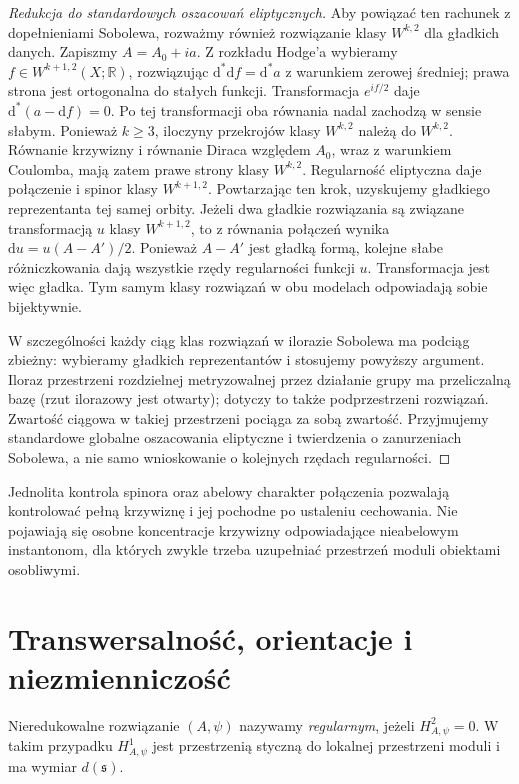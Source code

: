 \begin{proof}[Redukcja do standardowych oszacowań eliptycznych]
Aby powiązać ten rachunek z dopełnieniami Sobolewa,
rozważmy również rozwiązanie klasy $W^{k,2}$ dla
gładkich danych. Zapiszmy $A=A_0+ia$.
Z rozkładu Hodge'a wybieramy
$f\in W^{k+1,2}(X;\mathbb R)$, rozwiązując
$\mathrm d^*\mathrm df=\mathrm d^*a$ z warunkiem
zerowej średniej; prawa strona jest ortogonalna
do stałych funkcji. Transformacja $e^{if/2}$
daje $\mathrm d^*(a-\mathrm df)=0$.
Po tej transformacji oba równania nadal zachodzą
w sensie słabym. Ponieważ $k\geq3$, iloczyny
przekrojów klasy $W^{k,2}$ należą do $W^{k,2}$.
Równanie krzywizny i równanie Diraca względem
$A_0$, wraz z warunkiem Coulomba, mają zatem
prawe strony klasy $W^{k,2}$. Regularność
eliptyczna daje połączenie i spinor klasy
$W^{k+1,2}$. Powtarzając ten krok, uzyskujemy
gładkiego reprezentanta tej samej orbity.
Jeżeli dwa gładkie rozwiązania są związane
transformacją $u$ klasy $W^{k+1,2}$, to
z równania połączeń wynika
$\mathrm du=u(A-A')/2$. Ponieważ $A-A'$ jest
gładką formą, kolejne słabe różniczkowania
dają wszystkie rzędy regularności funkcji $u$.
Transformacja jest więc gładka.
Tym samym klasy rozwiązań w obu modelach
odpowiadają sobie bijektywnie.

W szczególności każdy ciąg klas rozwiązań
w ilorazie Sobolewa ma podciąg zbieżny:
wybieramy gładkich reprezentantów i stosujemy
powyższy argument. Iloraz przestrzeni
rozdzielnej metryzowalnej przez działanie grupy
ma przeliczalną bazę (rzut ilorazowy jest otwarty);
dotyczy to także podprzestrzeni rozwiązań.
Zwartość ciągowa w takiej przestrzeni
pociąga za sobą zwartość.
Przyjmujemy standardowe globalne oszacowania eliptyczne
i twierdzenia o zanurzeniach Sobolewa, a nie samo
wnioskowanie o kolejnych rzędach regularności.
\end{proof}

\begin{uwaga}
Jednolita kontrola spinora oraz abelowy charakter
połączenia pozwalają kontrolować pełną krzywiznę
i jej pochodne po ustaleniu cechowania. Nie pojawiają
się osobne koncentracje krzywizny odpowiadające
nieabelowym instantonom, dla których zwykle trzeba
uzupełniać przestrzeń moduli obiektami osobliwymi.
\end{uwaga}

\section{Transwersalność, orientacje i niezmienniczość}
\label{sec:tg-sw-transversality}

\begin{definicja}
Nieredukowalne rozwiązanie $(A,\psi)$ nazywamy
\emph{regularnym}, jeżeli $H^2_{A,\psi}=0$.
W takim przypadku $H^1_{A,\psi}$ jest przestrzenią
styczną do lokalnej przestrzeni moduli i ma wymiar
$d(\mathfrak s)$.
\end{definicja}

